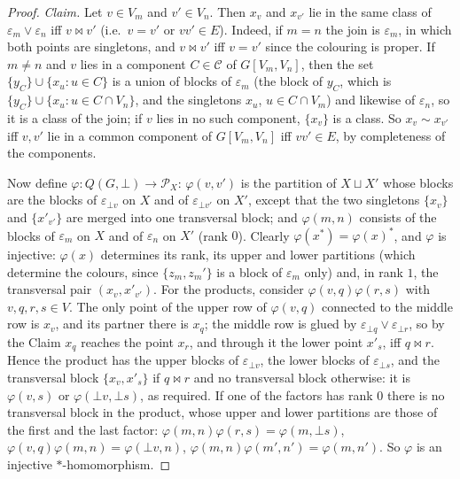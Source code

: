 \documentclass[11pt]{amsart}
\theoremstyle{definition}
\renewcommand{\P}{\mathcal{P}}
\begin{document}
\begin{proof}
\emph{Claim.} Let $v\in V_m$ and $v'\in V_n$. Then $x_v$ and $x_{v'}$ lie in the same class of $\varepsilon_m\vee\varepsilon_n$ iff $v\bowtie v'$ (i.e.\ $v=v'$ or $vv'\in E$). Indeed, if $m=n$ the join is $\varepsilon_m$, in which both points are singletons, and $v\bowtie v'$ iff $v=v'$ since the colouring is proper. If $m\ne n$ and $v$ lies in a component $C\in\mathcal C$ of $G[V_m,V_n]$, then the set $\{y_C\}\cup\{x_u:u\in C\}$ is a union of blocks of $\varepsilon_m$ (the block of $y_C$, which is $\{y_C\}\cup\{x_u:u\in C\cap V_n\}$, and the singletons $x_u$, $u\in C\cap V_m$) and likewise of $\varepsilon_n$, so it is a class of the join; if $v$ lies in no such component, $\{x_v\}$ is a class. So $x_v\sim x_{v'}$ iff $v,v'$ lie in a common component of $G[V_m,V_n]$ iff $vv'\in E$, by completeness of the components.

Now define $\varphi\colon Q(G,\bot)\to\P_X$: $\varphi(v,v')$ is the partition of $X\sqcup X'$ whose blocks are the blocks of $\varepsilon_{\bot v}$ on $X$ and of $\varepsilon_{\bot v'}$ on $X'$, except that the two singletons $\{x_v\}$ and $\{x'_{v'}\}$ are merged into one transversal block; and $\varphi(m,n)$ consists of the blocks of $\varepsilon_m$ on $X$ and of $\varepsilon_n$ on $X'$ (rank $0$). Clearly $\varphi(x^*)=\varphi(x)^*$, and $\varphi$ is injective: $\varphi(x)$ determines its rank, its upper and lower partitions (which determine the colours, since $\{z_m,z_m'\}$ is a block of $\varepsilon_m$ only) and, in rank $1$, the transversal pair $(x_v,x'_{v'})$. For the products, consider $\varphi(v,q)\varphi(r,s)$ with $v,q,r,s\in V$. The only point of the upper row of $\varphi(v,q)$ connected to the middle row is $x_v$, and its partner there is $x_q$; the middle row is glued by $\varepsilon_{\bot q}\vee\varepsilon_{\bot r}$, so by the Claim $x_q$ reaches the point $x_r$, and through it the lower point $x'_s$, iff $q\bowtie r$. Hence the product has the upper blocks of $\varepsilon_{\bot v}$, the lower blocks of $\varepsilon_{\bot s}$, and the transversal block $\{x_v,x'_s\}$ if $q\bowtie r$ and no transversal block otherwise: it is $\varphi(v,s)$ or $\varphi(\bot v,\bot s)$, as required. If one of the factors has rank $0$ there is no transversal block in the product, whose upper and lower partitions are those of the first and the last factor: $\varphi(m,n)\varphi(r,s)=\varphi(m,\bot s)$, $\varphi(v,q)\varphi(m,n)=\varphi(\bot v,n)$, $\varphi(m,n)\varphi(m',n')=\varphi(m,n')$. So $\varphi$ is an injective $*$-homomorphism.
\end{proof}
\end{document}
